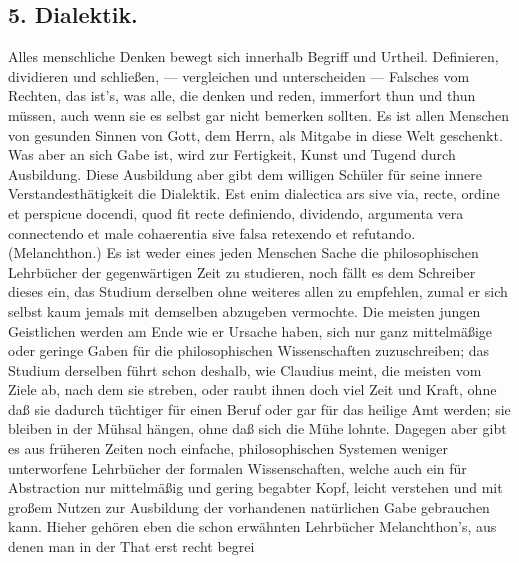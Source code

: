 \subsection*{5. Dialektik.}

Alles menschliche Denken bewegt sich innerhalb Begriff und Urtheil. Definieren, dividieren und schließen, — vergleichen und unterscheiden — Falsches vom Rechten, das ist’s, was alle, die denken und reden, immerfort thun und thun müssen, auch wenn sie es selbst gar nicht bemerken sollten. Es ist allen Menschen von gesunden Sinnen von Gott, dem Herrn, als
Mitgabe in diese Welt geschenkt. Was aber an sich Gabe ist, wird zur Fertigkeit, Kunst und Tugend durch Ausbildung. Diese Ausbildung aber gibt dem willigen Schüler für seine innere Verstandesthätigkeit die Dialektik. Est enim dialectica ars sive via, recte, ordine et perspicue docendi, quod fit recte definiendo, dividendo, argumenta vera connectendo et male cohaerentia sive falsa retexendo et refutando. (Melanchthon.) Es ist weder eines jeden Menschen Sache die philosophischen Lehrbücher der gegenwärtigen Zeit zu studieren, noch fällt es dem Schreiber dieses ein, das Studium derselben ohne weiteres allen zu empfehlen, zumal er sich selbst kaum jemals mit demselben abzugeben vermochte. Die meisten jungen Geistlichen werden am Ende wie er Ursache haben, sich nur ganz mittelmäßige oder geringe Gaben für die philosophischen Wissenschaften zuzuschreiben; das Studium derselben führt schon deshalb, wie Claudius meint, die meisten vom Ziele ab, nach dem sie streben, oder raubt ihnen doch viel Zeit und Kraft, ohne daß sie dadurch tüchtiger für einen Beruf oder gar für das heilige Amt werden; sie bleiben in der Mühsal hängen, ohne daß sich die Mühe lohnte. Dagegen aber gibt es aus früheren Zeiten noch einfache, philosophischen Systemen weniger unterworfene Lehrbücher der formalen Wissenschaften, welche auch ein für Abstraction nur mittelmäßig und gering begabter Kopf, leicht verstehen und mit großem Nutzen zur Ausbildung der vorhandenen natürlichen Gabe gebrauchen kann. Hieher gehören eben die schon erwähnten Lehrbücher Melanchthon’s, aus denen man in der That erst recht begrei%
